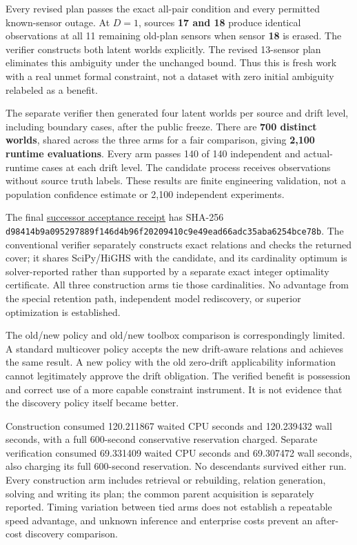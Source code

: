 \documentclass[
  11pt,
]{article}
\begin{document}
Every revised plan passes the exact all-pair condition and every
permitted known-sensor outage. At \(D=1\), sources \textbf{17 and 18}
produce identical observations at all 11 remaining old-plan sensors when
sensor \textbf{18} is erased. The verifier constructs both latent worlds
explicitly. The revised 13-sensor plan eliminates this ambiguity under
the unchanged bound. Thus this is fresh work with a real unmet formal
constraint, not a dataset with zero initial ambiguity relabeled as a
benefit.

The separate verifier then generated four latent worlds per source and
drift level, including boundary cases, after the public freeze. There
are \textbf{700 distinct worlds}, shared across the three arms for a
fair comparison, giving \textbf{2,100 runtime evaluations}. Every arm
passes 140 of 140 independent and actual-runtime cases at each drift
level. The candidate process receives observations without source truth
labels. These results are finite engineering validation, not a
population confidence estimate or 2,100 independent experiments.

The final
\href{https://github.com/MontrealAI/AGI-Alpha-Invention-Flywheel-Lab/blob/b0d828309f14ef4dc278dc522739df85db43c460/evidence/next009/verification/successor-primary-final-v2/artifacts/ACCEPTANCE.json}{successor
acceptance receipt} has SHA-256
\nolinkurl{d98414b9a095297889f146d4b96f20209410c9e49ead66adc35aba6254bce78b}.
The conventional verifier separately constructs exact relations and
checks the returned cover; it shares SciPy/HiGHS with the candidate, and
its cardinality optimum is solver-reported rather than supported by a
separate exact integer optimality certificate. All three construction
arms tie those cardinalities. No advantage from the special retention
path, independent model rediscovery, or superior optimization is
established.

The old/new policy and old/new toolbox comparison is correspondingly
limited. A standard multicover policy accepts the new drift-aware
relations and achieves the same result. A new policy with the old
zero-drift applicability information cannot legitimately approve the
drift obligation. The verified benefit is possession and correct use of
a more capable constraint instrument. It is not evidence that the
discovery policy itself became better.

Construction consumed 120.211867 waited CPU seconds and 120.239432 wall
seconds, with a full 600-second conservative reservation charged.
Separate verification consumed 69.331409 waited CPU seconds and
69.307472 wall seconds, also charging its full 600-second reservation.
No descendants survived either run. Every construction arm includes
retrieval or rebuilding, relation generation, solving and writing its
plan; the common parent acquisition is separately reported. Timing
variation between tied arms does not establish a repeatable speed
advantage, and unknown inference and enterprise costs prevent an
after-cost discovery comparison.
\end{document}
